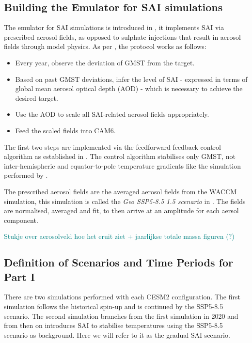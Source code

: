 \subsection{Building the Emulator for SAI simulations}
The emulator for SAI simulations is introduced in \textcite{pfluger2024}, it implements SAI via prescribed aerosol fields, as opposed to sulphate injections that result in aerosol fields through model physics. As per \textcite{pfluger2024}, the protocol works as follows:
\begin{itemize}
    \item Every year, observe the deviation of GMST from the target.
    \item Based on past GMST deviations, infer the level of SAI - expressed in terms of global mean aerosol optical depth (AOD) - which is necessary to achieve the desired target.
    \item Use the AOD to scale all SAI-related aerosol fields appropriately.
    \item Feed the scaled fields into CAM6.
\end{itemize}

The first two steps are implemented via the feedforward-feedback control algorithm as established in \textcite{kravitz2017}. The control algorithm stabilises only GMST, not inter-hemispheric and equator-to-pole temperature gradients like the simulation performed by \textcite{tilmes2020}.

The prescribed aerosol fields are the averaged aerosol fields from the WACCM simulation, this simulation is called the \textit{Geo SSP5-8.5 1.5 scenario} in \textcite{tilmes2020}. The fields are normalised, averaged and fit, to then arrive at an amplitude for each aersol component.

\textcolor{teal}{Stukje over aerosolveld hoe het eruit ziet + jaarlijkse totale massa figuren (?)}

\subsection{Definition of Scenarios and Time Periods for Part I}
There are two simulations performed with each CESM2 configuration. The first simulation follows the historical spin-up and is continued by the SSP5-8.5 scenario. The second simulation branches from the first simulation in 2020 and from then on introduces SAI to stabilise temperatures using the SSP5-8.5 scenario as background. Here we will refer to it as the gradual SAI scenario. 

